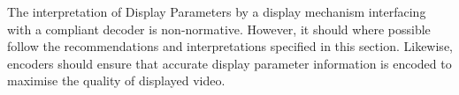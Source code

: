 The interpretation of Display Parameters by a display mechanism
interfacing with a compliant decoder is non-normative. However, it
should where possible follow the recommendations and interpretations
specified in this section. Likewise, encoders should ensure that
accurate display parameter information is encoded to maximise the
quality of displayed video.


